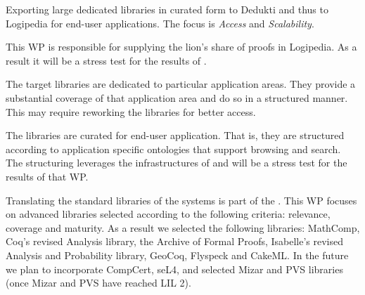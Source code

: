 \begin{workpackage}[id=libraries,type=RTD,wphases=1-48,
  short={Large libraries},%
  title={Large libraries},
  activity=na,
  lead=Tum,
  StrRM=18,
  ChaRM=12,
  TumRM=27]

\begin{wpobjectives}
Exporting large dedicated libraries in
curated form to Dedukti and thus to Logipedia for end-user applications.
The focus is \emph{Access} and \emph{Scalability}.
\begin{compactitem}
\item This WP is responsible for supplying the lion's share of proofs in
Logipedia.  As a result it will be a stress test for the results of .

\item The target libraries are dedicated to particular application
areas. They provide a substantial coverage of that application area
and do so in a structured manner. This may require reworking the
libraries for better access.

\item The libraries are curated for end-user application. That is, they
are structured according to application specific ontologies that
support browsing and search. The structuring leverages the
infrastructures of  and will be a
stress test for the results of that WP.
\end{compactitem}
\end{wpobjectives}


\begin{wpdescription}
Translating the standard libraries of the systems is part of the .
This WP focuses on advanced libraries selected according to the following criteria:
relevance, coverage and maturity.
As a result we selected the following libraries: MathComp, Coq's revised
Analysis library, the Archive of Formal Proofs, Isabelle's revised Analysis and Probability library,
GeoCoq, Flyspeck and CakeML. In the future we plan to incorporate
CompCert, seL4, and selected Mizar and PVS libraries (once Mizar and
PVS have reached LIL 2).
\end{wpdescription}


\begin{tasklist}


\end{tasklist}
\end{workpackage}
